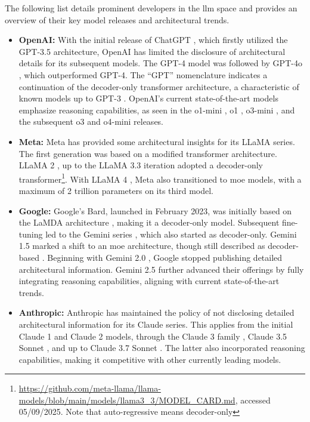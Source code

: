  The following list details prominent developers in the \ac{llm} space and provides an overview of their key model releases and architectural trends.
\begin{itemize}
    \item \textbf{OpenAI:} With the initial release of ChatGPT \cite{openai_introducing_2022}, which firstly utilized the GPT-3.5 architecture, OpenAI has limited the disclosure of architectural details for its subsequent models. The GPT-4 model \cite{openai_gpt-4_2024} was followed by GPT-4o \cite{openai_gpt-4o_2024}, which outperformed GPT-4. The \enquote{GPT} nomenclature indicates a continuation of the decoder-only transformer architecture, a characteristic of known models up to GPT-3 \cite{brown_language_2020}. OpenAI's current state-of-the-art models emphasize reasoning capabilities, as seen in the o1-mini \cite{openai_openai_2024}, o1 \cite{openai_openai_2024-1}, o3-mini \cite{openai_openai_2025}, and the subsequent o3 and o4-mini \cite{openai_openai_2025-1} releases.

    \item \textbf{Meta:} Meta has provided some architectural insights for its LLaMA series. The first generation \cite{touvron_llama_2023} was based on a modified transformer architecture. LLaMA 2 \cite{touvron_llama_2023-1}, up to the LLaMA 3.3 iteration adopted a decoder-only transformer\footnote{\url{https://github.com/meta-llama/llama-models/blob/main/models/llama3_3/MODEL_CARD.md}, accessed 05/09/2025. Note that auto-regressive means decoder-only}. With LLaMA 4 \cite{meta_ai_llama_2025}, Meta also transitioned to \ac{moe} models, with a maximum of 2 trillion parameters on its third model.

    \item \textbf{Google:} Google's Bard, launched in February 2023, was initially based on the LaMDA architecture \cite{pichai_important_2023,thoppilan_lamda_2022}, making it a decoder-only model. Subsequent fine-tuning led to the Gemini series \cite{team_gemini_2024}, which also started as decoder-only. Gemini 1.5 marked a shift to an \ac{moe} architecture, though still described as decoder-based \cite{team_gemini_2024-1}. Beginning with Gemini 2.0 \cite{pichai_introducing_2024}, Google stopped publishing detailed architectural information. Gemini 2.5 \cite{kavukcuoglu_gemini_2025} further advanced their offerings by fully integrating reasoning capabilities, aligning with current state-of-the-art trends.

    \item \textbf{Anthropic:} Anthropic has maintained the policy of not disclosing detailed architectural information for its Claude series. This applies from the initial Claude 1 \cite{anthropic_introducing_2023} and Claude 2 \cite{anthropic_claude_2023} models, through the Claude 3 family \cite{anthropic_introducing_2024-1}, Claude 3.5 Sonnet \cite{anthropic_introducing_2024}, and up to Claude 3.7 Sonnet \cite{anthropic_claude_2025}. The latter also incorporated reasoning capabilities, making it competitive with other currently leading models.


\end{itemize}
